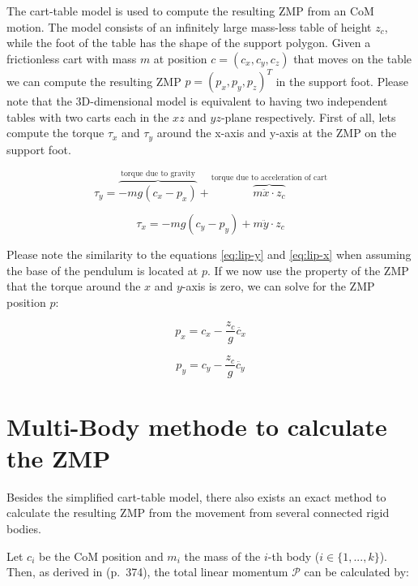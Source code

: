 \documentclass[english,ngerman]{KITreprt}
\begin{document}
The cart-table model is used to compute the resulting ZMP from an CoM
motion. The model consists of an infinitely large mass-less table of
height $z_c$, while the foot of the table has the shape of the support
polygon. Given a frictionless cart with mass $m$ at position
$c = (c_x, c_y, c_z)$ that moves on the table we can compute the
resulting ZMP $p = (p_x, p_y, p_z)^T$ in the support foot. Please note
that the 3D-dimensional model is equivalent to having two independent
tables with two carts each in the $xz$ and $yz$-plane respectively.
First of all, lets compute the torque $\tau_x$ and $\tau_y$ around the
x-axis and y-axis at the ZMP on the support foot.

\begin{equation}
\tau_y = \overbrace{-m g (c_x - p_x)}^{\text{torque due to gravity}} + \overbrace{m \ddot{x} \cdot z_c}^{\text{torque due to acceleration of cart}}
\end{equation}

\begin{equation}
\tau_x = -m g (c_y - p_y) + m \ddot{y} \cdot z_c
\end{equation}

Please note the similarity to the equations \ref{eq:lip-y} and
\ref{eq:lip-x} when assuming the base of the pendulum is located at $p$.
If we now use the property of the ZMP that the torque around the $x$ and
$y$-axis is zero, we can solve for the ZMP position $p$:

\begin{equation} \label{eq:zmp-x}
p_x = c_x - \frac{z_c}{g} \ddot{c_x}
\end{equation}

\begin{equation} \label{eq:zmp-y}
p_y = c_y - \frac{z_c}{g} \ddot{c_y}
\end{equation}

\section{Multi-Body methode to calculate the
ZMP}\label{section:multi-body-zmp}

Besides the simplified cart-table model, there also exists an exact
method to calculate the resulting ZMP from the movement from several
connected rigid bodies.

Let $c_i$ be the CoM position and $m_i$ the mass of the $i$-th body
($i \in \{1, ..., k\}$). Then, as derived in
\cite{siciliano2008springer} (p.~374), the total linear momentum
$\mathcal{P}$ can be calculated by:
\end{document}
